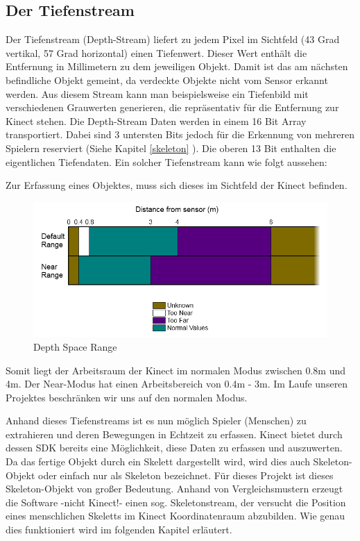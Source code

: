 \subsection{Der Tiefenstream}
Der Tiefenstream (Depth-Stream) liefert zu jedem Pixel im Sichtfeld (43 Grad vertikal, 57 Grad horizontal) einen Tiefenwert. Dieser Wert enthält die Entfernung in Millimetern zu dem jeweiligen Objekt.
Damit ist das am nächsten befindliche Objekt gemeint, da verdeckte Objekte nicht vom Sensor erkannt werden.
Aus diesem Stream kann man beispielsweise ein Tiefenbild mit verschiedenen Grauwerten generieren, die repräsentativ für die Entfernung zur Kinect stehen. Die Depth-Stream Daten werden in einem 16 Bit Array transportiert. Dabei sind 3 untersten Bits jedoch für die Erkennung von mehreren Spielern reserviert
(Siehe Kapitel \ref{skeleton} ). Die oberen 13 Bit enthalten die eigentlichen Tiefendaten. Ein solcher Tiefenstream kann wie folgt aussehen:



Zur Erfassung eines Objektes, muss sich dieses im Sichtfeld der Kinect befinden. 
\begin{figure}[H]						
	\centering							
	\includegraphics[scale=0.7]{Bilder/kinect_range.png}			
	\caption{Depth Space Range \cite{ws:kinect_depthspace}}						
	\label{f:kinect_range}						
\end{figure}

Somit liegt der Arbeitsraum der Kinect im normalen Modus zwischen 0.8m und 4m. Der Near-Modus hat einen Arbeitsbereich von 0.4m - 3m. Im Laufe unseren Projektes beschränken wir uns auf den normalen Modus.

Anhand dieses Tiefenstreams ist es nun möglich Spieler (Menschen) zu extrahieren und deren Bewegungen
in Echtzeit zu erfassen. Kinect bietet durch dessen SDK bereits eine Möglichkeit, diese Daten zu
erfassen und auszuwerten. Da das fertige Objekt durch ein Skelett dargestellt wird, wird dies auch Skeleton-Objekt oder einfach nur als Skeleton bezeichnet. Für dieses Projekt ist dieses Skeleton-Objekt von großer Bedeutung. Anhand von Vergleichsmustern erzeugt die Software -nicht Kinect!- einen sog. Skeletonstream, der versucht die Position eines menschlichen Skeletts im Kinect Koordinatenraum abzubilden.\cite{SWB-376536934}
Wie genau dies funktioniert wird im folgenden Kapitel erläutert.



